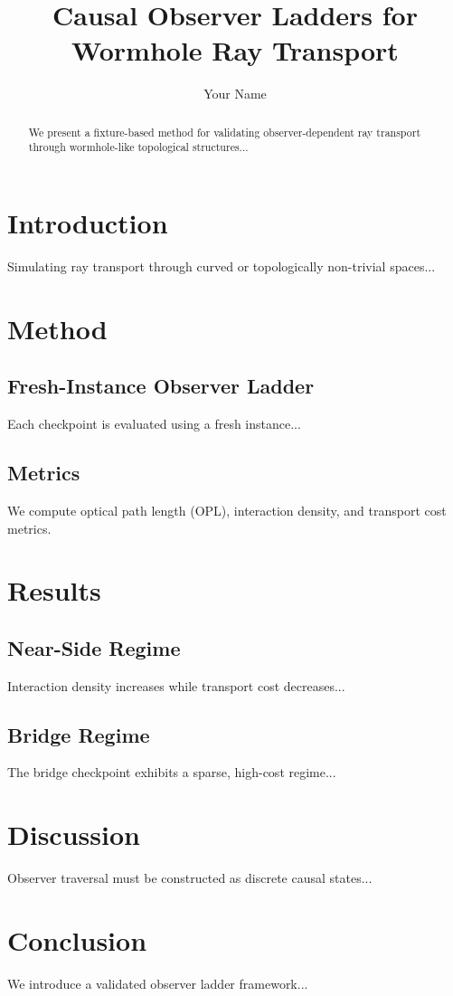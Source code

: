 \documentclass[11pt]{article}
\title{Causal Observer Ladders for Wormhole Ray Transport}
\author{Your Name}
\date{}
\begin{document}
\maketitle

\begin{abstract}
We present a fixture-based method for validating observer-dependent ray transport through wormhole-like topological structures...
\end{abstract}

\section{Introduction}
Simulating ray transport through curved or topologically non-trivial spaces...

\section{Method}

\subsection{Fresh-Instance Observer Ladder}
Each checkpoint is evaluated using a fresh instance...

\subsection{Metrics}
We compute optical path length (OPL), interaction density, and transport cost metrics.

\section{Results}

\subsection{Near-Side Regime}
Interaction density increases while transport cost decreases...

\subsection{Bridge Regime}
The bridge checkpoint exhibits a sparse, high-cost regime...

\section{Discussion}
Observer traversal must be constructed as discrete causal states...

\section{Conclusion}
We introduce a validated observer ladder framework...
\end{document}

